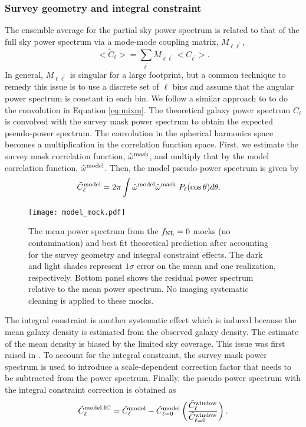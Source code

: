 \subsubsection{Survey geometry and integral constraint}
The ensemble average for the partial sky power spectrum is related to that of the full sky power spectrum via a mode-mode coupling matrix, $M_{\ell \ell^{\prime}}$,
\begin{equation}\label{eq:mixm}
    <\tilde{C}_{\ell}> = \sum_{\ell^{\prime}} M_{\ell \ell^{\prime}}<C_{\ell^{\prime}}>.
\end{equation}
In general, $M_{\ell \ell^{\prime}}$ is singular for a large footprint, but a common technique to remedy this issue is to use a discrete set of $\ell$ bins and assume that the angular power spectrum is constant in each bin. We follow a similar approach to \cite{chon2004fast} to do the convolution in Equation \ref{eq:mixm}. The theoretical galaxy power spectrum $C_{\ell}$ is convolved with the survey mask power spectrum to obtain the expected pseudo-power spectrum. The convolution in the spherical harmonics space becomes a multiplication in the correlation function space. First, we estimate the survey mask correlation function, $\hat{\omega}^{\rm mask}$, and multiply that by the model correlation function, $\hat{\omega}^{\rm model}$. Then, the model pseudo-power spectrum is given by
\begin{align}
    \tilde{C}^{\rm model}_{\ell} &= 2\pi \int \hat{\omega}^{\rm model}\hat{\omega}^{\rm mask}~P_{\ell}(\cos \theta) d\theta.
\end{align}

 \begin{figure}
\centering
\texttt{[image: model\_mock.pdf]}
\caption{The mean power spectrum from the $f_{\rm NL}=0$ mocks (no contamination) and best fit theoretical prediction after accounting for the survey geometry and integral constraint effects. The dark and light shades represent $1\sigma$ error on the mean and one realization, respectively. Bottom panel shows the residual power spectrum relative to the mean power spectrum. No imaging systematic cleaning is applied to these mocks.}\label{fig:model_mock}
\end{figure}

The integral constraint is another systematic effect which is induced because the mean galaxy density is estimated from the observed galaxy density. The estimate of the mean density is biased by the limited sky coverage. This issue was first raised in \cite{peacock1991large}. To account for the integral constraint, the survey mask power spectrum is used to introduce a scale-dependent correction factor that needs to be subtracted from the power spectrum. Finally, the pseudo power spectrum with the integral constraint correction is obtained as
\begin{equation}
     \tilde{C}^{\rm model, IC}_{\ell} = \tilde{C}^{\rm model}_{\ell} - \tilde{C}^{\rm model}_{\ell=0} \left(\frac{\tilde{C}^{\rm window}_{\ell}}{\tilde{C}^{\rm window}_{\ell=0}}\right).
\end{equation}


